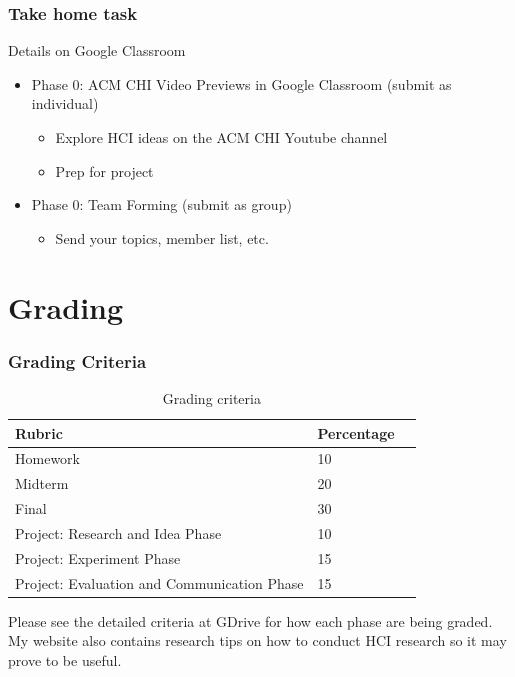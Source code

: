 \documentclass{beamer}
\begin{document}
\begin{frame}
\frametitle{Take home task}
Details on Google Classroom
\begin{itemize}
	\item Phase 0: ACM CHI Video Previews in Google Classroom (submit as individual)
	\begin{itemize}
		\item Explore HCI ideas on the ACM CHI Youtube channel
		\item Prep for project 
	\end{itemize}
	\item Phase 0: Team Forming (submit as group)
	\begin{itemize}
		\item Send your topics, member list, etc. 
	\end{itemize}
\end{itemize}
\end{frame}

\section{Grading} %

\begin{frame}
\frametitle{Grading Criteria}
\begin{table}
	\begin{tabular}{l l l}
		\toprule
		\textbf{Rubric} & \textbf{Percentage} \\
		\midrule
		Homework & 10 \\
		Midterm & 20 \\
		Final & 30 \\
		Project: Research and Idea Phase & 10 \\
		Project: Experiment Phase & 15 \\
		Project: Evaluation and Communication Phase & 15 \\
		\bottomrule
	\end{tabular}
	\caption{Grading criteria}
\end{table}
Please see the detailed criteria at GDrive for how each phase are being graded.  My website also contains research tips on how to conduct HCI research so it may prove to be useful.
\end{frame}
\end{document}
